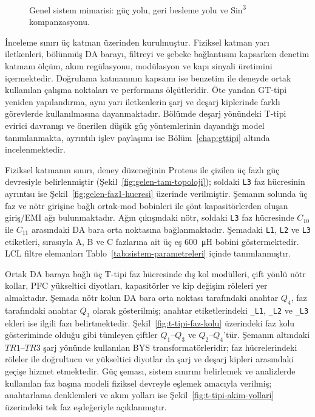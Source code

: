 \begin{figure}[H]
  \centering
  \resizebox{0.98\textwidth}{!}{}
  \caption{Genel sistem mimarisi: güç yolu, geri besleme yolu ve Sin\textsuperscript{3} kompanzasyonu.}
  \label{fig:genel-sistem-mimarisi}
\end{figure}

İnceleme sınırı üç katman üzerinden kurulmuştur. Fiziksel katman yarı iletkenleri, bölünmüş DA barayı, filtreyi ve şebeke bağlantısını kapsarken denetim katmanı ölçüm, akım regülasyonu, modülasyon ve kapı sinyali üretimini içermektedir. Doğrulama katmanının kapsamı ise benzetim ile deneyde ortak kullanılan çalışma noktaları ve performans ölçütleridir. Öte yandan GT-tipi yeniden yapılandırma, aynı yarı iletkenlerin şarj ve deşarj kiplerinde farklı görevlerde kullanılmasına dayanmaktadır. Bölümde deşarj yönündeki T-tipi evirici davranışı ve önerilen düşük güç yöntemlerinin dayandığı model tanımlanmakta, ayrıntılı işlev paylaşımı ise Bölüm~\ref{chap:gttipi} altında incelenmektedir.

Fiziksel katmanın sınırı, deney düzeneğinin Proteus ile çizilen üç fazlı güç devresiyle belirlenmiştir (Şekil~\ref{fig:gelen-tam-topoloji}); soldaki \texttt{L3} faz hücresinin ayrıntısı ise Şekil~\ref{fig:gelen-faz1-hucresi} üzerinde verilmiştir. Şemanın solunda üç faz ve nötr girişine bağlı ortak-mod bobinleri ile şönt kapasitörlerden oluşan giriş/EMI ağı bulunmaktadır. Ağın çıkışındaki nötr, soldaki \texttt{L3} faz hücresinde $C_{10}$ ile $C_{11}$ arasındaki DA bara orta noktasına bağlanmaktadır. Şemadaki \texttt{L1}, \texttt{L2} ve \texttt{L3} etiketleri, sırasıyla A, B ve C fazlarına ait üç eş \SI{600}{\micro\henry} bobini göstermektedir. LCL filtre elemanları Tablo~\ref{tab:sistem-parametreleri} içinde tanımlanmıştır.

Ortak DA baraya bağlı üç T-tipi faz hücresinde dış kol modülleri, çift yönlü nötr kollar, PFC yükseltici diyotları, kapasitörler ve kip değişim röleleri yer almaktadır. Şemada nötr kolun DA bara orta noktası tarafındaki anahtar $Q_4$, faz tarafındaki anahtar $Q_3$ olarak gösterilmiş; anahtar etiketlerindeki \texttt{\_L1}, \texttt{\_L2} ve \texttt{\_L3} ekleri ise ilgili fazı belirtmektedir. Şekil~\ref{fig:t-tipi-faz-kolu} üzerindeki faz kolu gösteriminde olduğu gibi tümleyen çiftler $Q_1$--$Q_3$ ve $Q_2$--$Q_4$'tür. Şemanın altındaki $TR1$--$TR3$ şarj yönünde kullanılan BYS transformatörleridir; faz hücrelerindeki röleler ile doğrultucu ve yükseltici diyotlar da şarj ve deşarj kipleri arasındaki geçişe hizmet etmektedir. Güç şeması, sistem sınırını belirlemek ve analizlerde kullanılan faz başına modeli fiziksel devreyle eşlemek amacıyla verilmiş; anahtarlama denklemleri ve akım yolları ise Şekil~\ref{fig:t-tipi-akim-yollari} üzerindeki tek faz eşdeğeriyle açıklanmıştır.

